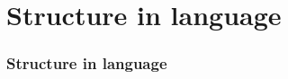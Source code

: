 \documentclass{beamer}
\begin{document}
\section{Structure in language}

\begin{frame}
\frametitle{Structure in language}
\end{frame}
\end{document}
